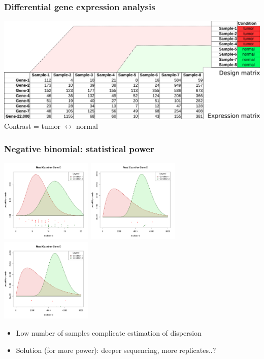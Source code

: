 \documentclass{beamer}			  %
\begin{document}
\begin{frame}
	\frametitle{Differential gene expression analysis}
		\includegraphics[width=\textwidth]{figures/dge_11bp.pdf} \\
	Contrast = tumor $\leftrightarrow$ normal
\end{frame}

\begin{frame}
	\frametitle{Negative binomial: statistical power}
	\includegraphics[width=0.33\textwidth]{figures/dge_12ap.png}
	\includegraphics[width=0.33\textwidth]{figures/dge_12bp.png}
	\includegraphics[width=0.33\textwidth]{figures/dge_12cp.png}
	
	\begin{itemize}
		\item Low number of samples complicate estimation of dispersion
		\item Solution (for more power): deeper sequencing, more replicates..?
	\end{itemize}
\end{frame}
\end{document}
